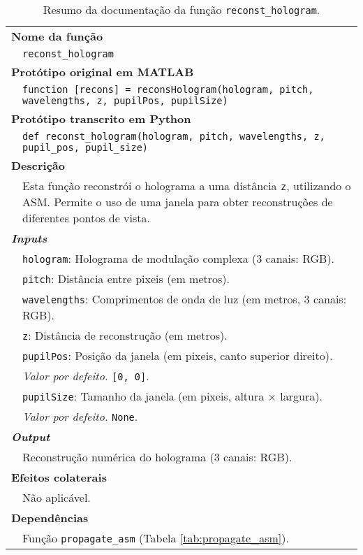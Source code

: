 \begin{table}[!htbp]
    \centering
    \caption{Resumo da documentação da função \texttt{reconst\_hologram}.}
    \label{tab:reconst_hologram}
    \begin{tabular}{p{1cm} p{10cm}}
        \hline
        \multicolumn{2}{l}{\bfseries Nome da função}\\
         & \verb|reconst_hologram|\\
        \hline
        \multicolumn{2}{l}{\bfseries Protótipo original em MATLAB}\\
         & \texttt{function [recons] = reconsHologram(hologram, pitch, wavelengths, z, pupilPos, pupilSize)
         }\\
        \hline
        \multicolumn{2}{l}{\bfseries Protótipo transcrito em Python}\\
         & \texttt{def reconst_hologram(hologram, pitch, wavelengths, z, pupil_pos, pupil_size)} \\
        \hline\multicolumn{2}{l}{\bfseries Descrição}\\
         & Esta função reconstrói o holograma a uma distância \verb|z|, utilizando o \ac{ASM}. Permite o uso de uma janela para obter reconstruções de diferentes pontos de vista.\\
        \hline\multicolumn{2}{l}{\bfseries \textit{Inputs}}\\
         & \verb|hologram|: Holograma de modulação complexa (3 canais: \ac{RGB}). \\
         & \verb|pitch|: Distância entre pixeis (em metros).\\
         & \verb|wavelengths|: Comprimentos de onda de luz (em metros, 3 canais: \ac{RGB}).\\
         & \verb|z|: Distância de reconstrução (em metros).\\
         & \verb|pupilPos|: Posição da janela (em pixeis, canto superior direito).\\
         & \hspace{1cm} \textit{Valor por defeito.} \verb|[0, 0]|.\\
         & \verb|pupilSize|: Tamanho da janela (em pixeis, altura $\times$ largura).\\
         & \hspace{1cm} \textit{Valor por defeito.} \verb|None|.\\
        \hline\multicolumn{2}{l}{\bfseries \textit{Output}}\\
         & Reconstrução numérica do holograma (3 canais: \ac{RGB}).\\
        \hline\multicolumn{2}{l}{\bfseries Efeitos colaterais}\\
         & Não aplicável. \\
        \hline\multicolumn{2}{l}{\bfseries Dependências}\\
         & Função \verb|propagate_asm| (Tabela \ref{tab:propagate_asm}). \\
        \hline
    \end{tabular}
\end{table}


